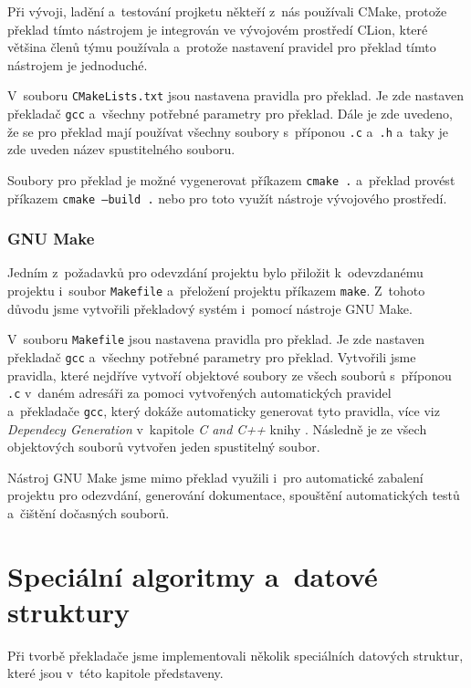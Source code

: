 \documentclass[a4paper, 11pt]{article}
\begin{document}
	Při vývoji, ladění a~testování projketu někteří z~nás používali CMake, protože překlad tímto nástrojem
	je integrován ve vývojovém prostředí CLion, které většina členů týmu používala a~protože nastavení pravidel
	pro překlad tímto nástrojem je jednoduché.

	V~souboru \texttt{CMakeLists.txt} jsou nastavena pravidla pro překlad. Je zde nastaven překladač \texttt{gcc}
	a~všechny potřebné parametry pro překlad. Dále je zde uvedeno, že se pro překlad mají používat všechny soubory s~příponou
	\texttt{.c} a~\texttt{.h} a~taky je zde uveden název spustitelného souboru.

	Soubory pro překlad je možné vygenerovat příkazem \texttt{cmake~.} a~překlad provést příkazem \texttt{cmake~--build~.}
	nebo pro toto využít nástroje vývojového prostředí.

	\subsubsection{GNU Make}

	Jedním z~požadavků pro odevzdání projektu bylo přiložit k~odevzdanému projektu i~soubor \texttt{Makefile} a~přeložení
	projektu příkazem \texttt{make}. Z~tohoto důvodu jsme vytvořili překladový systém i~pomocí nástroje GNU Make.

	V~souboru \texttt{Makefile} jsou nastavena pravidla pro překlad. Je zde nastaven překladač \texttt{gcc}
	a~všechny potřebné parametry pro překlad. Vytvořili jsme pravidla, které nejdříve vytvoří objektové soubory
	ze všech souborů s~příponou \texttt{.c} v~daném adresáři za pomoci vytvořených automatických pravidel a~překladače \texttt{gcc},
	který dokáže automaticky generovat tyto pravidla, více viz \emph{Dependecy Generation} v~kapitole \emph{C and C++}
	knihy \cite{Mecklenburgc2005}. Následně je ze všech objektových souborů vytvořen jeden spustitelný
	soubor.

	Nástroj GNU Make jsme mimo překlad využili i~pro automatické zabalení projektu pro odezvdání, generování dokumentace,
	spouštění automatických testů a~čištění dočasných souborů.



	\section{Speciální algoritmy a~datové struktury}

	Při tvorbě překladače jsme implementovali několik speciálních datových struktur,
	které jsou v~této kapitole představeny.
\end{document}
